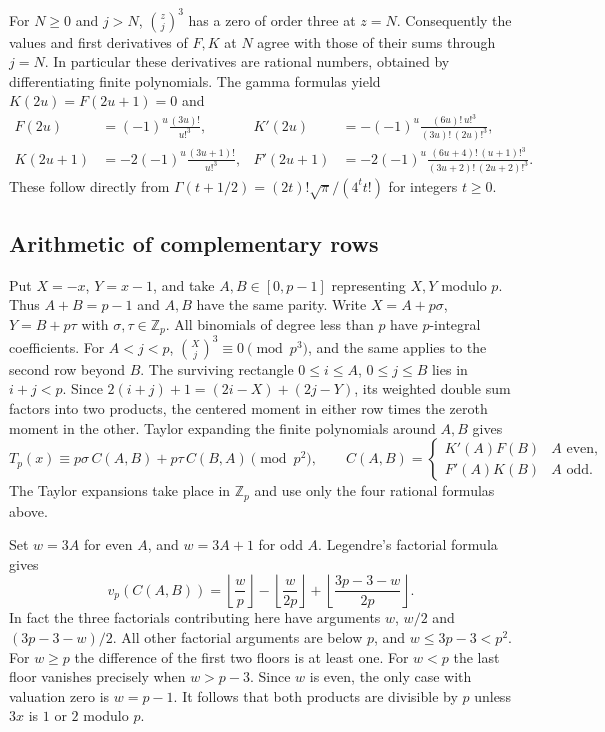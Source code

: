 \documentclass[11pt,a4paper]{article}
\theoremstyle{definition}\newtheorem{problem}[theorem]{Auxiliary problem}
\theoremstyle{remark}\newtheorem*{remark}{Remark}
\begin{document}
For $N\ge0$ and $j>N$, $\binom zj^3$ has a zero of order three at $z=N$.
Consequently the values and first derivatives of $F,K$ at $N$ agree with those of their sums through $j=N$.
In particular these derivatives are rational numbers, obtained by differentiating finite polynomials.
The gamma formulas yield $K(2u)=F(2u+1)=0$ and
\begin{align*}
 F(2u)&=(-1)^u\frac{(3u)!}{u!^3},&
 K'(2u)&=-(-1)^u\frac{(6u)!\,u!^3}{(3u)!\,(2u)!^3},\\
 K(2u+1)&=-2(-1)^u\frac{(3u+1)!}{u!^3},&
 F'(2u+1)&=-2(-1)^u\frac{(6u+4)!\,(u+1)!^3}{(3u+2)!\,(2u+2)!^3}.
\end{align*}
These follow directly from $\Gamma(t+1/2)=(2t)!\sqrt\pi/(4^t t!)$ for integers $t\geq0$.

\subsection*{Arithmetic of complementary rows}
Put $X=-x$, $Y=x-1$, and take $A,B\in[0,p-1]$ representing $X,Y$
modulo $p$. Thus $A+B=p-1$ and $A,B$ have the same parity. Write
$X=A+p\sigma$, $Y=B+p\tau$ with $\sigma,\tau\in\mathbb Z_p$.
All binomials of degree less than $p$ have $p$-integral coefficients.
For $A<j<p$, $\binom Xj^3\equiv0\pmod{p^3}$, and the same applies to the second row beyond $B$.
The surviving rectangle $0\leq i\leq A$, $0\leq j\leq B$ lies in $i+j<p$.
Since $2(i+j)+1=(2i-X)+(2j-Y)$, its weighted double sum factors into two products,
the centered moment in either row times the zeroth moment in the other.
Taylor expanding the finite polynomials around $A,B$ gives
\[
 T_p(x)\equiv p\sigma\,C(A,B)+p\tau\,C(B,A)\pmod{p^2},
 \qquad
 C(A,B)=\begin{cases}K'(A)F(B)&A\text{ even},\\
 F'(A)K(B)&A\text{ odd}.
 \end{cases}
\]
The Taylor expansions take place in $\mathbb Z_p$ and use only the four rational formulas above.

Set $w=3A$ for even $A$, and $w=3A+1$ for odd $A$. Legendre's factorial formula gives
\[
 v_p(C(A,B))=
 \left\lfloor\frac w p\right\rfloor-
 \left\lfloor\frac w {2p}\right\rfloor+
 \left\lfloor\frac{3p-3-w}{2p}\right\rfloor .
\]
In fact the three factorials contributing here have arguments $w$, $w/2$ and $(3p-3-w)/2$.
All other factorial arguments are below $p$, and $w\leq3p-3<p^2$.
For $w\geq p$ the difference of the first two floors is at least one.
For $w<p$ the last floor vanishes precisely when $w>p-3$. Since $w$ is even, the only case with valuation zero is $w=p-1$.
It follows that both products are divisible by $p$ unless $3x$ is $1$ or $2$ modulo $p$.
\end{document}
